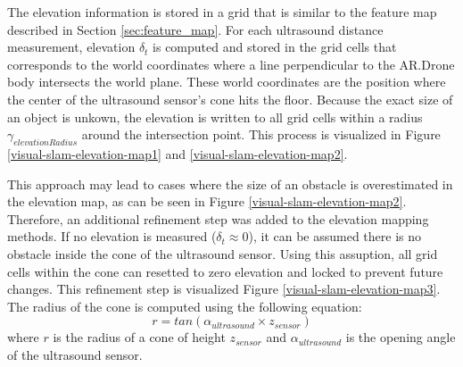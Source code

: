 The elevation information is stored in a grid that is similar to the feature map described in Section \ref{sec:feature_map}.
For each ultrasound distance measurement, elevation $\delta_t$ is computed and stored in the grid cells that corresponds to the world coordinates where a line perpendicular to the AR.Drone body intersects the world plane.
These world coordinates are the position where the center of the ultrasound sensor's cone hits the floor.
Because the exact size of an object is unkown, the elevation is written to all grid cells within a radius $\gamma_{elevationRadius}$ around the intersection point.
This process is visualized in Figure \ref{visual-slam-elevation-map1} and \ref{visual-slam-elevation-map2}.

This approach may lead to cases where the size of an obstacle is overestimated in the elevation map, as can be seen in Figure \ref{visual-slam-elevation-map2}.
Therefore, an additional refinement step was added to the elevation mapping methods.
If no elevation is measured ($\delta_t \approx 0$), it can be assumed there is no obstacle inside the cone of the ultrasound sensor.
Using this assuption, all grid cells within the cone can resetted to zero elevation and locked to prevent future changes.
This refinement step is visualized Figure \ref{visual-slam-elevation-map3}.
The radius of the cone is computed using the following equation:
\begin{equation}
r = tan (\alpha_{ultrasound} \times z_{sensor})
\end{equation}
where $r$ is the radius of a cone of height $z_{sensor}$ and $\alpha_{ultrasound}$ is the opening angle of the ultrasound sensor.

